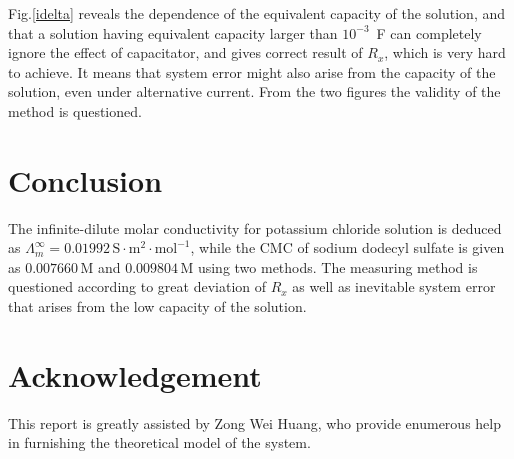 \documentclass[%
 reprint,
 amsmath,amssymb,
 aps,
]{revtex4-1}
\begin{document}
Fig.\ref{idelta} reveals the dependence of the equivalent capacity of the solution, and that a solution having equivalent capacity larger than $10^{-3}$~F can completely ignore the effect of capacitator, and gives correct result of $R_x$, which is very hard to achieve. It means that system error might also arise from the capacity of the solution, even under alternative current. From the two figures the validity of the method is questioned.

\section{Conclusion}
The infinite-dilute molar conductivity for potassium chloride solution is deduced as $\Lambda_m^\infty = 0.01992 \, \mathrm{S\cdot m^2 \cdot mol^{-1}}$, while the CMC of sodium dodecyl sulfate is given as $0.007660 \, \mathrm{M}$ and $0.009804 \, \mathrm{M}$ using two methods. The measuring method is questioned according to great deviation of $R_x$ as well as inevitable system error that arises from the low capacity of the solution.


\section{Acknowledgement}
This report is greatly assisted by Zong Wei Huang, who provide enumerous help in furnishing the theoretical model of the system.
\end{document}
